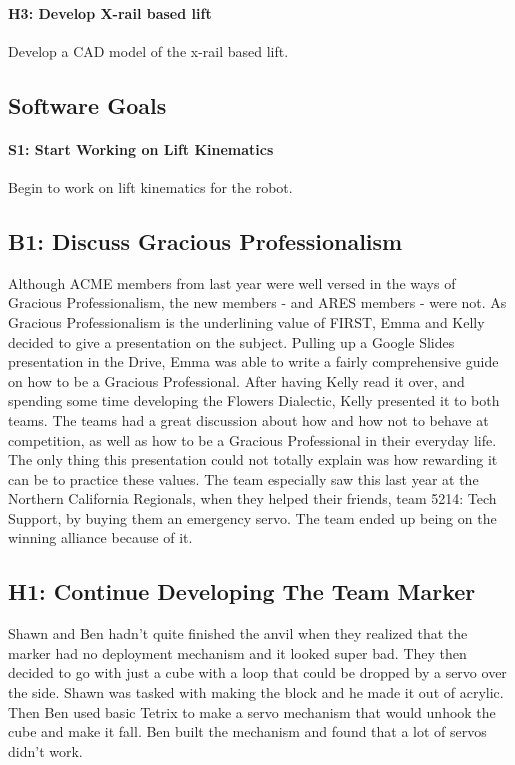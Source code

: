 \documentclass{article}
\begin{document}
\paragraph{H3: Develop X-rail based lift}
 Develop a CAD model of the x-rail based lift.
\subsection{Software Goals}
\paragraph{S1: Start Working on Lift Kinematics}
 Begin to work on lift kinematics for the robot.
\newpage
\subsection{B1: Discuss Gracious Professionalism}

Although ACME members from last year were well versed in the ways of Gracious Professionalism, the new members - and ARES members - were not. As Gracious Professionalism is the underlining value of FIRST, Emma and Kelly decided to give a presentation on the subject. Pulling up a Google Slides presentation in the Drive, Emma was able to write a fairly comprehensive guide on how to be a Gracious Professional. After having Kelly read it over, and spending some time developing the Flowers Dialectic, Kelly presented it to both teams. The teams had a great discussion about how and how not to behave at competition, as well as how to be a Gracious Professional in their everyday life. The only thing this presentation could not totally explain was how rewarding it can be to practice these values. The team especially saw this last year at the Northern California Regionals, when they helped their friends, team 5214: Tech Support, by buying them an emergency servo. The team ended up being on the winning alliance because of it.  
\subsection{H1: Continue Developing The Team Marker}

Shawn and Ben hadn't quite finished the anvil when they realized that the marker had no deployment mechanism and it looked super bad. They then decided to go with just a cube with a loop that could be dropped by a servo over the side. Shawn was tasked with making the block and he made it out of acrylic. Then Ben used basic Tetrix to make a servo mechanism that would unhook the cube and make it fall. Ben built the mechanism and found that a lot of servos didn't work.
\end{document}

